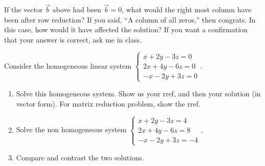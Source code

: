 If the vector $\vec b$ above had been $\vec b=0$, what would the right most column have been after row reduction?  If you said, ``A column of all zeros,'' then congrats.  In this case, how would it have affected the solution? If you want a confirmation that your answer is correct, ask me in class. 

\begin{problem}
Consider the homogeneous linear system $\begin{cases}x+2y-3z=0\\ 2x+4y-6z=0\\ -x-2y+3z=0\end{cases}.$ 
\begin{enumerate}
 \item Solve this homogeneous system. Show us your rref, and then your solution (in vector form). For matrix reduction problem, show the rref.
 \item Solve the non homogeneous system $\begin{cases}x+2y-3z=4\\ 2x+4y-6z=8\\ -x-2y+3z=-4\end{cases}.$ 
 \item Compare and contrast the two solutions.
\end{enumerate}
\end{problem}


